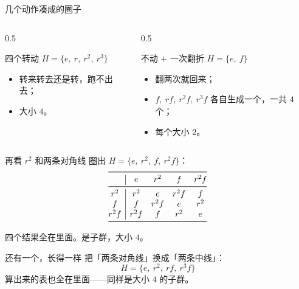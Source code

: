 \documentclass[10pt]{beamer}
\begin{document}
\begin{frame}{几个动作凑成的圈子}
  \begin{columns}[T]
    \begin{column}{0.5\textwidth}
      \begin{block}{四个转动}
        \(H=\{e,\ r,\ r^2,\ r^3\}\)
        \begin{itemize}
          \item 转来转去还是转，跑不出去；
          \item 大小 \(4\)。
        \end{itemize}
      \end{block}
    \end{column}
    \begin{column}{0.5\textwidth}
      \begin{block}{不动 \(+\) 一次翻折}
        \(H=\{e,\ f\}\)
        \begin{itemize}
          \item 翻两次就回来；
          \item \(f,\ rf,\ r^2f,\ r^3f\) 各自生成一个，一共 \(4\) 个；
          \item 每个大小 \(2\)。
        \end{itemize}
      \end{block}
    \end{column}
  \end{columns}
\end{frame}

\begin{frame}{再看 \(r^2\) 和两条对角线}
  圈出 \(H=\{e,\ r^2,\ f,\ r^2f\}\)：
  \pause
  \[
  \begin{array}{@{}c|cccc@{}}
    \toprule
    & e & r^2 & f & r^2f \\
    \midrule
    r^2 & r^2 & e & r^2f & f \\
    f & f & r^2f & e & r^2 \\
    r^2f & r^2f & f & r^2 & e \\
    \bottomrule
  \end{array}
  \]
  \pause
  \begin{center}
    四个结果全在里面。\quad 是子群，大小 \(4\)。
  \end{center}
\end{frame}

\begin{frame}{还有一个，长得一样}
  把「两条对角线」换成「两条中线」：
  \[
    H=\{e,\ r^2,\ rf,\ r^3f\}
  \]
  \pause
  算出来的表也全在里面——同样是大小 \(4\) 的子群。
\end{frame}
\end{document}
